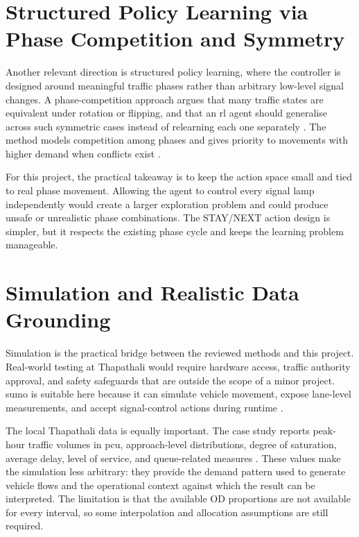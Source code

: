 \section{Structured Policy Learning via Phase Competition and Symmetry}
\label{sec:structured_policy_learning}
\noindent Another relevant direction is structured policy learning, where the controller is designed around meaningful traffic phases rather than arbitrary low-level signal changes. A phase-competition approach argues that many traffic states are equivalent under rotation or flipping, and that an \gls{rl} agent should generalise across such symmetric cases instead of relearning each one separately \cite{zheng2019learning}. The method models competition among phases and gives priority to movements with higher demand when conflicts exist \cite{zheng2019learning}.

For this project, the practical takeaway is to keep the action space small and tied to real phase movement. Allowing the agent to control every signal lamp independently would create a larger exploration problem and could produce unsafe or unrealistic phase combinations. The STAY/NEXT action design is simpler, but it respects the existing phase cycle and keeps the learning problem manageable.

\section{Simulation and Realistic Data Grounding}
\label{sec:simulation_grounding}
\noindent Simulation is the practical bridge between the reviewed methods and this project. Real-world testing at Thapathali would require hardware access, traffic authority approval, and safety safeguards that are outside the scope of a minor project. \gls{sumo} is suitable here because it can simulate vehicle movement, expose lane-level measurements, and accept signal-control actions during runtime \cite{zheng2019learning}.

The local Thapathali data is equally important. The case study reports peak-hour traffic volumes in \gls{pcu}, approach-level distributions, degree of saturation, average delay, level of service, and queue-related measures \cite{maharjan2023performance}. These values make the simulation less arbitrary: they provide the demand pattern used to generate vehicle flows and the operational context against which the result can be interpreted. The limitation is that the available OD proportions are not available for every interval, so some interpolation and allocation assumptions are still required.

